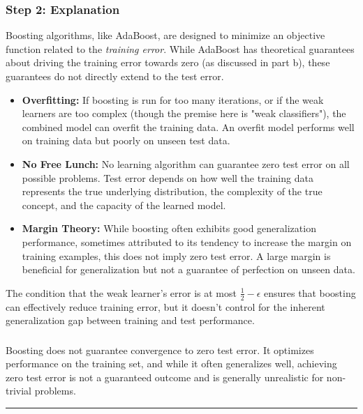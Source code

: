 \documentclass{article}
\begin{document}
\subsubsection*{Step 2: Explanation}
\parbox{\textwidth}{
Boosting algorithms, like AdaBoost, are designed to minimize an objective function related to the \emph{training error}. While AdaBoost has theoretical guarantees about driving the training error towards zero (as discussed in part b), these guarantees do not directly extend to the test error.
\begin{itemize}
    \item \textbf{Overfitting:} If boosting is run for too many iterations, or if the weak learners are too complex (though the premise here is "weak classifiers"), the combined model can overfit the training data. An overfit model performs well on training data but poorly on unseen test data.
    \item \textbf{No Free Lunch:} No learning algorithm can guarantee zero test error on all possible problems. Test error depends on how well the training data represents the true underlying distribution, the complexity of the true concept, and the capacity of the learned model.
    \item \textbf{Margin Theory:} While boosting often exhibits good generalization performance, sometimes attributed to its tendency to increase the margin on training examples, this does not imply zero test error. A large margin is beneficial for generalization but not a guarantee of perfection on unseen data.
\end{itemize}
The condition that the weak learner's error is at most $\tfrac12 - \epsilon$ ensures that boosting can effectively reduce training error, but it doesn't control for the inherent generalization gap between training and test performance.
}

\subsubsection*{}
\parbox{\textwidth}{
Boosting does not guarantee convergence to zero test error. It optimizes performance on the training set, and while it often generalizes well, achieving zero test error is not a guaranteed outcome and is generally unrealistic for non-trivial problems.
}

\noindent\rule{\textwidth}{0.4pt}

\newpage

\end{document}
